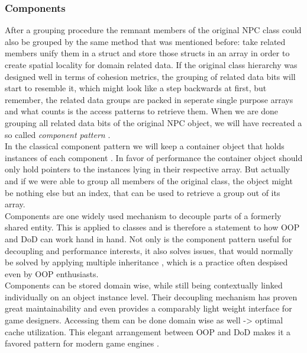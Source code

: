 \subsubsection{Components}
After a grouping procedure the remnant members of the original NPC class could also be grouped by the same method that was mentioned before: take related members unify them in a struct and store those structs in an array in order to create spatial locality for domain related data. If the original class hierarchy was designed well in terms of cohesion metrics, the grouping of related data bits will start to resemble it, which might look like a step backwards at first, but remember, the related data groups are packed in seperate single purpose arrays and what counts is the access patterns to retrieve them. When we are done grouping all related data bits of the original NPC object, we will have recreated a so called \textit{component pattern} .\\
In the classical component pattern we will keep a container object that holds instances of each component . In favor of performance the container object should only hold pointers to the instances lying in their respective array. But actually and if we were able to group all members of the original class, the object might be nothing else but an index, that can be used to retrieve a group out of its array.\\
Components are one widely used mechanism to decouple parts of a formerly shared entity. This is applied to classes and is therefore a statement to how OOP and DoD can work hand in hand. Not only is the component pattern useful for decoupling and performance interests, it also solves issues, that would normally be solved by applying multiple inheritance , which is a practice often despised even by OOP enthusiasts.\\
Components can be stored domain wise, while still being contextually linked individually on an object instance level. Their decoupling mechanism has proven great maintainability and even provides a comparably light weight interface for game designers. Accessing them can be done domain wise as well -> optimal cache utilization. This elegant arrangement between OOP and DoD makes it a favored pattern for modern game engines .
